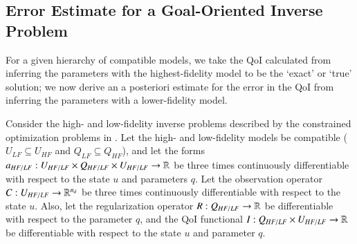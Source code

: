 \subsection[Error Estimate for a Goal-Oriented Inverse Problem]{Error Estimate for a Goal-Oriented Inverse Problem}  \label{sec:deriv}
%
For a given hierarchy of compatible models, we take the QoI calculated from inferring the parameters with the highest-fidelity model to be the `exact' or `true' solution; we now derive an a posteriori estimate for the error in the QoI from inferring the parameters with a lower-fidelity model.
%
\begin{proposition}
\label{thm:error_estimate}
Consider the high- and low-fidelity inverse problems described by the constrained optimization problems in . Let the high- and low-fidelity models be compatible ($U_{LF}\subseteq U_{HF}$ and $Q_{LF}\subseteq Q_{HF}$), and let the forms $a_{HF/LF}:U_{HF/LF} \times Q_{HF/LF} \times U_{HF/LF} \to {\mathbb{R}}$ be three times continuously differentiable with respect to the state $u$ and parameters $q$. Let the observation operator $C:U_{HF/LF}\to{\mathbb{R}}^{n_d}$ be three times continuously differentiable with respect to the state $u$. Also, let the regularization operator $R:Q_{HF/LF}\to{\mathbb{R}}$ be differentiable with respect to the parameter $q$, and the QoI functional $I:Q_{HF/LF}\times U_{HF/LF}\to{\mathbb{R}}$ be differentiable with respect to the state $u$ and parameter $q$.


\end{proposition}
